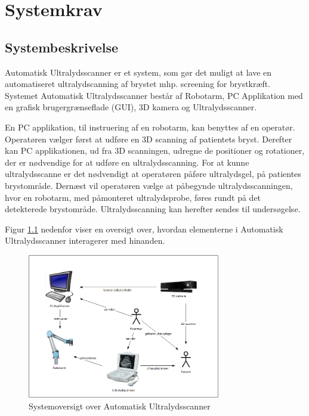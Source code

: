\chapter{Systemkrav}\label{Systemkrav}
\section{Systembeskrivelse}
Automatisk Ultralydsscanner er et system, som gør det muligt at lave en automatiseret ultralydscanning af brystet mhp. screening for brystkræft. Systemet Automatisk Ultralydsscanner består af Robotarm, PC Applikation med en grafisk brugergrænseflade (GUI), 3D kamera og Ultralydsscanner.  

En PC applikation, til instruering af en robotarm, kan benyttes af en operatør. Operatøren vælger først at udføre en 3D scanning af patientets bryst. Derefter kan PC applikationen, ud fra 3D scanningen, udregne de positioner og rotationer, der er nødvendige for at udføre en ultralydsscanning. For at kunne ultralydsscanne er det nødvendigt at operatøren påføre ultralydsgel, på patientes brystområde. Dernæst vil operatøren vælge at påbegynde ultralydsscanningen, hvor en robotarm, med påmonteret ultralydsprobe, føres rundt på det detekterede brystområde. Ultralydsscanning kan herefter sendes til undersøgelse.

Figur \ref{System} nedenfor viser en oversigt over, hvordan elementerne i Automatisk Ultralydsscanner interagerer med hinanden.
 
\begin{figure}[H]
    \centering
    \includegraphics[width=0.75\textwidth]{figurer/d/Kravspecifikation/Systembeskrivelse}
    \caption{Systemoversigt over Automatisk Ultralydsscanner}
    \label{System}
\end{figure}

